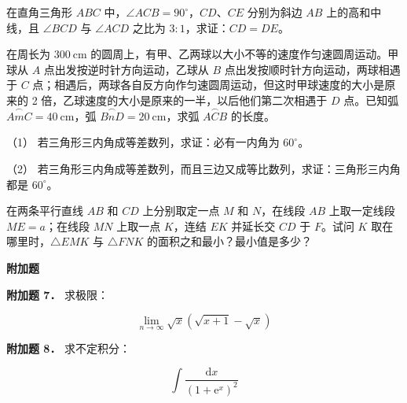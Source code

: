 \begin{question}
在直角三角形 $ABC$ 中，$\angle ACB=90^\circ$，$CD\text{、}CE$ 分别为斜边 $AB$ 上的高和中线，且 $\angle BCD$ 与 $\angle ACD$ 之比为 $3:1$，求证：$CD=DE$。
\nopagebreak[4]
\begin{center}\end{center}
\nopagebreak[4]
\end{question}
\begin{question}
在周长为 $300\ \mathrm{cm}$ 的圆周上，有甲、乙两球以大小不等的速度作匀速圆周运动。甲球从 $A$ 点出发按逆时针方向运动，乙球从 $B$ 点出发按顺时针方向运动，两球相遇于 $C$ 点；相遇后，两球各自反方向作匀速圆周运动，但这时甲球速度的大小是原来的 2 倍，乙球速度的大小是原来的一半，以后他们第二次相遇于 $D$ 点。已知弧 $\overset{\frown}{AmC}=40\ \mathrm{cm}$，弧 $\overset{\frown}{BnD}=20\ \mathrm{cm}$，求弧 $\overset{\frown}{ACB}$ 的长度。

\end{question}
\begin{question}

（1） 若三角形三内角成等差数列，求证：必有一内角为 $60^\circ$。

（2） 若三角形三内角成等差数列，而且三边又成等比数列，求证：三角形三内角都是 $60^\circ$。

\end{question}
\begin{question}
在两条平行直线 $AB$ 和 $CD$ 上分别取定一点 $M$ 和 $N$，在线段 $AB$ 上取一定线段 $ME=a$；在线段 $MN$ 上取一点 $K$，连结 $EK$ 并延长交 $CD$ 于 $F$。试问 $K$ 取在哪里时，$\triangle EMK$ 与 $\triangle FNK$ 的面积之和最小？最小值是多少？

\begin{gktip}
\Needspace{0.25\textheight}
\textbf{附加题}
\end{gktip}

\textbf{附加题 7．} 求极限：

\nopagebreak[4]
\[
\lim_{n\to\infty}\sqrt{x}\left(\sqrt{x+1}-\sqrt{x}\right)
\]

\textbf{附加题 8．} 求不定积分：

\nopagebreak[4]
\[
\int\frac{\mathrm dx}{(1+\mathrm e^x)^2}
\]

\end{question}